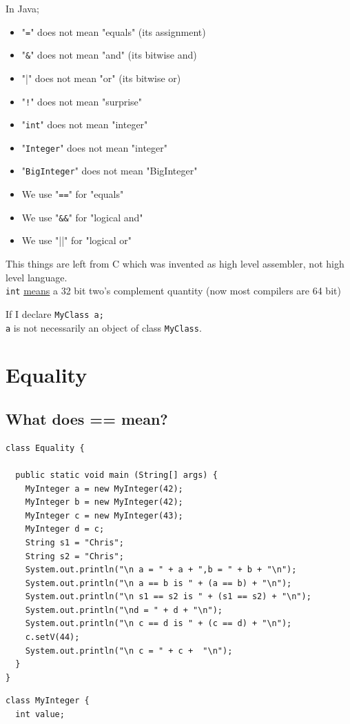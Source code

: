 \documentclass{article}
\begin{document}
\begin{flushleft}
In Java;
\begin{itemize}
 \item "\verb|=|" does not mean "equals" (its assignment)
 \item "\verb|&|" does not mean "and" (its bitwise and)
 \item "|" does not mean "or" (its bitwise or)
 \item "\verb|!|" does not mean "surprise"
 \item "\verb|int|" does not mean "integer"
 \item "\verb|Integer|" does not mean "integer"
 \item "\verb|BigInteger|" does not mean "BigInteger"
\end{itemize}
\bigskip
\begin{itemize}
 \item We use "\verb|==|" for "equals"
 \item We use "\verb|&&|" for "logical and"
 \item We use "||" for "logical or"
\end{itemize}
\begin{flushleft}
 This things are left from C which was invented as high level assembler, not high level language.\\
 \verb|int| \underline{means} a 32 bit two's complement quantity (now most compilers are 64 bit)
\end{flushleft}
\bigskip
\begin{flushleft}
 If I declare \verb|MyClass a;|\\
 \verb|a| is not necessarily an object of class \verb|MyClass|.
\end{flushleft}
\bigskip
\section*{Equality}
\subsection*{What does == mean?}
\begin{verbatim}
class Equality {

  public static void main (String[] args) {
    MyInteger a = new MyInteger(42);
    MyInteger b = new MyInteger(42);
    MyInteger c = new MyInteger(43);
    MyInteger d = c;
    String s1 = "Chris";
    String s2 = "Chris";
    System.out.println("\n a = " + a + ",b = " + b + "\n");
    System.out.println("\n a == b is " + (a == b) + "\n");
    System.out.println("\n s1 == s2 is " + (s1 == s2) + "\n");
    System.out.println("\nd = " + d + "\n");
    System.out.println("\n c == d is " + (c == d) + "\n");
    c.setV(44);
    System.out.println("\n c = " + c +  "\n");
  }
}
\end{verbatim}
\bigskip
\begin{verbatim}
class MyInteger {
  int value;
  

\end{verbatim}
\end{flushleft}
\end{document}
